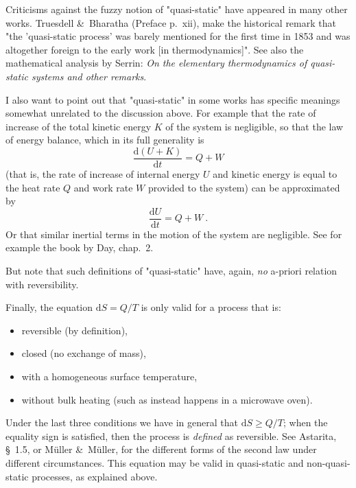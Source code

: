 \documentclass[a4paper,12pt,%
onecolumn,oneside,titlepage,%
british%
]{memoir}
\newcommand*{\amp}{\&}
\renewcommand*{\ge}{\geqslant}%
\renewcommand*{\|}[1][]{\nonscript\:#1\vert\nonscript\:\mathopen{}}
\newcommand*{\sect}{\S}%
\begin{document}
Criticisms against the fuzzy notion of "quasi-static" have appeared in many other works. Truesdell \amp\ Bharatha (Preface p.~xii), make the historical remark that "the 'quasi-static process' was barely mentioned for the first time in 1853 and was altogether foreign to the early work [in thermodynamics]". See also the mathematical analysis by Serrin: \emph{On the elementary thermodynamics of quasi-static systems and other remarks}.

\medskip

I also want to point out that "quasi-static" in some works has specific meanings somewhat unrelated to the discussion above. For example that the rate of increase of the total kinetic energy $K$ of the system is negligible, so that the law of energy balance, which in its full generality is
$$ \frac{\mathrm{d}(U+K)}{\mathrm{d}t}  = Q + W$$
(that is, the rate of increase of internal energy $U$ and kinetic energy is equal to the heat rate $Q$ and work rate $W$ provided to the system) can be approximated by
$$ \frac{\mathrm{d}U}{\mathrm{d}t}  = Q + W \ .$$
Or that similar inertial terms in the motion of the system are negligible. See for example the book by Day, chap.~2.

But note that such definitions of "quasi-static" have, again, \emph{no} a-priori relation with reversibility.

\medskip

Finally, the equation $\mathrm{d}S = Q/T$ is only valid for a process that is:
\begin{itemize}
\item reversible (by definition),
\item closed (no exchange of mass),
\item with a homogeneous surface temperature,
\item without bulk heating (such as instead happens in a microwave oven).
\end{itemize}
Under the last three conditions we have in general that $\mathrm{d}S \ge Q/T$; when the equality sign is satisfied, then the process is \emph{defined} as reversible. See Astarita, \sect~1.5, or Müller \amp\ Müller, for the different forms of the second law under different circumstances. This equation may be valid in quasi-static and non-quasi-static processes, as explained above.


\end{document}
